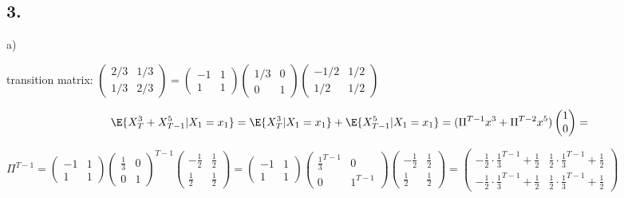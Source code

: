 \subsection*{3.}
a)

transition matrix: 
$\begin{pmatrix}
2/3 & 1/3 \\
1/3 & 2/3
\end{pmatrix} 
=
\begin{pmatrix}
-1 & 1 \\
1 & 1
\end{pmatrix}
\begin{pmatrix}
1/3 & 0 \\
0 & 1 
\end{pmatrix}
\begin{pmatrix}
-1/2 &1/2 \\
1/2 & 1/2
\end{pmatrix}$

\begin{gather*}
    \E{X_T^3+X_{T-1}^5 | X_1=x_1} =\E{X_T^3| X_1=x_1} + \E{X_{T-1}^5| X_1=x_1} = (\Pi^{T-1} x^3 + \Pi^{T-2} x^5) \begin{pmatrix}
    1 \\ 0
    \end{pmatrix} = 
\end{gather*}

$\Pi^{T-1}= 
\begin{pmatrix}
-1 & 1 \\
1 & 1
\end{pmatrix}
\begin{pmatrix}
\frac{1}{3} & 0 \\
0 & 1 
\end{pmatrix}^{T-1}
\begin{pmatrix}
-\frac{1}{2} & \frac{1}{2} \\
\frac{1}{2} & \frac{1}{2}
\end{pmatrix}=
\begin{pmatrix}
-1 & 1 \\
1 & 1
\end{pmatrix}
\begin{pmatrix}
\frac{1}{3}^{T-1} & 0 \\
0 & 1^{T-1} 
\end{pmatrix}
\begin{pmatrix}
-\frac{1}{2} &\frac{1}{2} \\
\frac{1}{2} & \frac{1}{2}
\end{pmatrix}=
\begin{pmatrix}
-\frac{1}{2} \cdot\frac{1}{3}^{T-1} +\frac{1}{2} & \frac{1}{2} \cdot\frac{1}{3}^{T-1} +\frac{1}{2} \\
-\frac{1}{2} \cdot\frac{1}{3}^{T-1} +\frac{1}{2} & \frac{1}{2} \cdot\frac{1}{3}^{T-1} +\frac{1}{2}
\end{pmatrix} $

